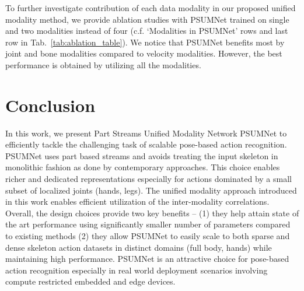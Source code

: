 \documentclass[runningheads]{llncs}
\begin{document}
To further investigate contribution of each data modality in our proposed unified modality method, we provide ablation studies with PSUMNet trained on single and two modalities instead of four (c.f. `Modalities in PSUMNet' rows and last row in Tab.~\ref{tab:ablation_table}). We notice that PSUMNet benefits most by joint and bone modalities compared to velocity modalities. However, the best performance is obtained by utilizing all the modalities.



\section{Conclusion}
\label{sec:conclusion}

In this work, we present Part Streams Unified Modality Network PSUMNet to efficiently tackle the challenging task of scalable pose-based action recognition. PSUMNet uses part based streams and avoids treating the input skeleton in monolithic fashion as done by contemporary approaches. This choice enables richer  and dedicated representations especially for actions dominated by a small subset of localized joints (hands, legs). The unified modality approach introduced in this work enables efficient utilization of the inter-modality correlations. Overall, the design choices provide two key benefits -- (1) they help attain state of the art performance using significantly smaller number of parameters compared to existing methods (2) they allow PSUMNet to easily scale to both sparse and dense skeleton action datasets in distinct domains (full body, hands) while maintaining high performance. PSUMNet is an attractive choice for pose-based action recognition especially in real world deployment scenarios involving compute restricted embedded and edge devices.



\end{document}
